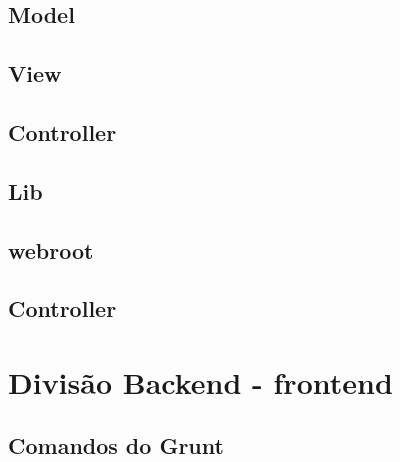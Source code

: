         \subsection{Model\label{sec:app-model}}

        \subsection{View\label{sec:app-view}}

        \subsection{Controller\label{sec:app-controller}}

        \subsection{Lib\label{sec:app-lib}}

        \subsection{webroot\label{sec:app-lib}}


        \subsection{Controller\label{sec:app-controller}}


    \section{Divisão Backend - frontend\label{sec:back-front}}


        \subsection{Comandos do Grunt\label{sub:comandos-grunt}}

